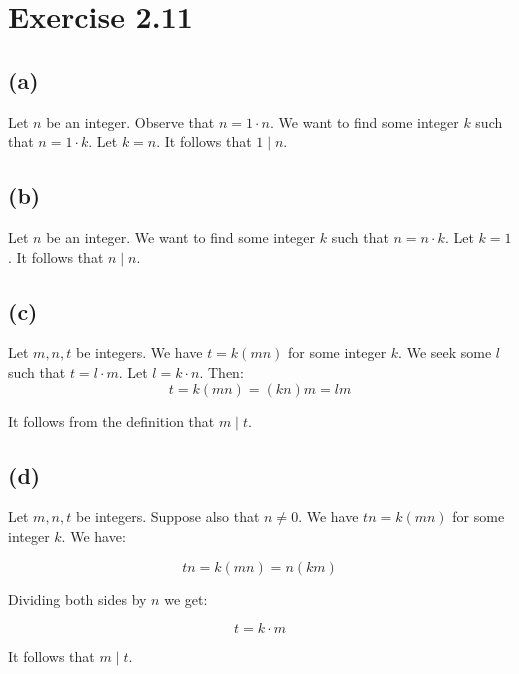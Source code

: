 \documentclass{article}
\begin{document}
\section*{Exercise 2.11}

\subsection*{(a)}

Let $n$ be an integer. Observe that $n = 1 \cdot n$. We want to find some
integer $k$ such that $n = 1 \cdot k$. Let $k=n$. It follows that $1 \mid n$.

\subsection*{(b)}

Let $n$ be an integer. We want to find some integer $k$ such that $n = n \cdot
k$. Let $k=1$. It follows that $n \mid n$.

\subsection*{(c)}

Let $m, n, t$ be integers. We have $t = k(mn)$ for some integer $k$. We seek
some $l$ such that $t = l \cdot m$. Let $l=k \cdot n$. Then:
\begin{equation*}
	t = k(mn) = (kn)m = lm
\end{equation*}

It follows from the definition that $m \mid t$.


\subsection*{(d)}


Let $m, n, t$ be integers. Suppose also that $n \neq 0$. We have $tn = k(mn)$ for some integer $k$. We have:

\begin{equation*}
	tn = k(mn) = n(km) 
\end{equation*}

Dividing both sides by $n$ we get:


\begin{equation*}
	t = k \cdot m
\end{equation*}

It follows that $m \mid t$.
\end{document}

